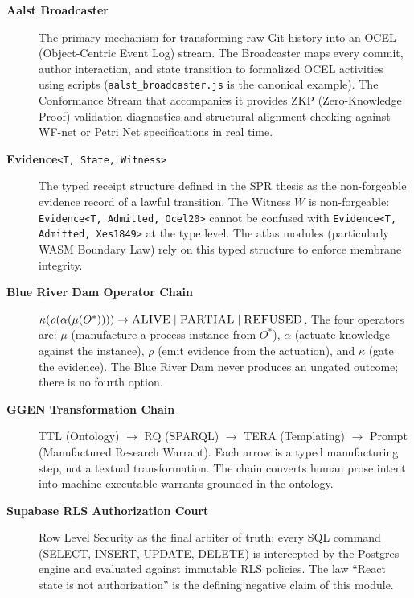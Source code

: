 \begin{description}
  \item[\textbf{Aalst Broadcaster}] The primary mechanism for transforming raw
        Git history into an OCEL (Object-Centric Event Log) stream. The
        Broadcaster maps every commit, author interaction, and state transition
        to formalized OCEL activities using scripts (\texttt{aalst\_broadcaster.js}
        is the canonical example). The Conformance Stream that accompanies it
        provides ZKP (Zero-Knowledge Proof) validation diagnostics and
        structural alignment checking against WF-net or Petri Net specifications
        in real time.

  \item[\textbf{Evidence}\texttt{<T, State, Witness>}] The typed receipt
        structure defined in the SPR thesis as the non-forgeable evidence record
        of a lawful transition. The Witness $W$ is non-forgeable:
        \texttt{Evidence<T, Admitted, Ocel20>} cannot be confused with
        \texttt{Evidence<T, Admitted, Xes1849>} at the type level. The atlas
        modules (particularly WASM Boundary Law) rely on this typed structure to
        enforce membrane integrity.

  \item[\textbf{Blue River Dam Operator Chain}]
        $\kappa(\rho(\alpha(\mu(O^*)))) \to \textsc{ALIVE} \mid \textsc{PARTIAL}
        \mid \textsc{REFUSED}$. The four operators are: $\mu$ (manufacture a
        process instance from $O^*$), $\alpha$ (actuate knowledge against the
        instance), $\rho$ (emit evidence from the actuation), and $\kappa$ (gate
        the evidence). The Blue River Dam never produces an ungated outcome;
        there is no fourth option.

  \item[\textbf{GGEN Transformation Chain}]
        TTL (Ontology) $\to$ RQ (SPARQL) $\to$ TERA (Templating) $\to$ Prompt
        (Manufactured Research Warrant). Each arrow is a typed manufacturing
        step, not a textual transformation. The chain converts human prose intent
        into machine-executable warrants grounded in the ontology.

  \item[\textbf{Supabase RLS Authorization Court}] Row Level Security as the
        final arbiter of truth: every SQL command (SELECT, INSERT, UPDATE, DELETE)
        is intercepted by the Postgres engine and evaluated against immutable
        RLS policies. The law ``React state is not authorization'' is the
        defining negative claim of this module.


\end{description}
